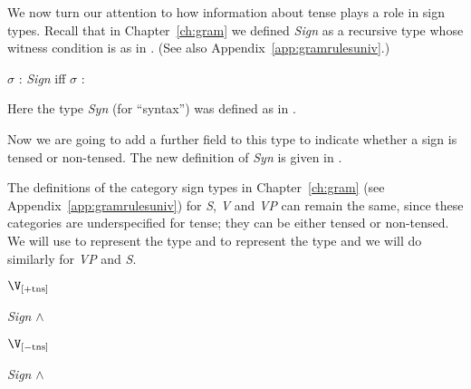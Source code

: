 We now turn our attention to how information about tense plays a role
in sign types.  Recall that in Chapter~\ref{ch:gram} we defined
\textit{Sign} as a recursive type whose witness condition is as in
\nexteg{}.  (See also Appendix~\ref{app:gramrulesuniv}.)
\begin{ex} 
$\sigma$ : \textit{Sign} iff $\sigma$ :  
\end{ex} 
Here the type \textit{Syn} (for ``syntax'') was defined as in
\nexteg{}.
\begin{ex} 
\end{ex} 
Now we are going to add a further field to this type to indicate
whether a sign is tensed or non-tensed.  The new definition of
\textit{Syn} is given in \nexteg{}.
\begin{ex} 
\end{ex} 
The definitions of the category sign types in Chapter~\ref{ch:gram}
(see Appendix~\ref{app:gramrulesuniv}) for \textit{S}, \textit{V} and
\textit{VP} can remain the same, since these categories are
underspecified for tense; they can be either tensed or non-tensed.  We
will use  to represent the type  and  to
represent the type  and we will do similarly for \textit{VP}
and \textit{S}.
\begin{ex} 
\begin{subex} 
 
\item $\displaystyle\V_{[+\mathrm{tns}]}$ 
 
\item \textit{Sign} \d{$\wedge$} 
         
\item $\displaystyle\V_{[-\mathrm{tns}]}$ 
 
\item \textit{Sign} \d{$\wedge$} 
\end{subex} 
   
\end{ex} 
